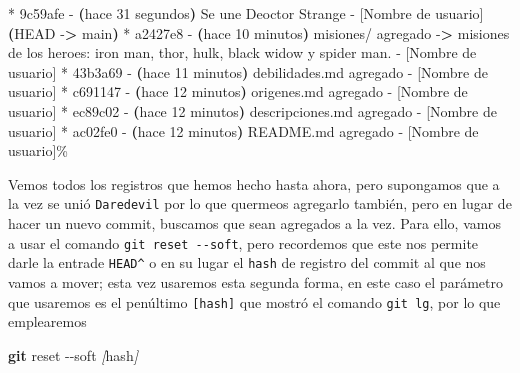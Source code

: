 \documentclass[
]{book}
\newenvironment{Shaded}{\begin{snugshade}}{\end{snugshade}}
\newcommand{\AttributeTok}[1]{\textcolor[rgb]{0.13,0.29,0.53}{#1}}
\newcommand{\ErrorTok}[1]{\textcolor[rgb]{0.64,0.00,0.00}{\textbf{#1}}}
\newcommand{\ExtensionTok}[1]{#1}
\newcommand{\FunctionTok}[1]{\textcolor[rgb]{0.13,0.29,0.53}{\textbf{#1}}}
\newcommand{\KeywordTok}[1]{\textcolor[rgb]{0.13,0.29,0.53}{\textbf{#1}}}
\newcommand{\NormalTok}[1]{#1}
\newcommand{\OperatorTok}[1]{\textcolor[rgb]{0.81,0.36,0.00}{\textbf{#1}}}
\newcommand{\PreprocessorTok}[1]{\textcolor[rgb]{0.56,0.35,0.01}{\textit{#1}}}
\newcommand{\SpecialStringTok}[1]{\textcolor[rgb]{0.31,0.60,0.02}{#1}}
\begin{document}
\begin{Shaded}
\begin{Highlighting}[]
\ExtensionTok{*}\NormalTok{ 9c59afe }\AttributeTok{{-}} \ErrorTok{(}\ExtensionTok{hace}\NormalTok{ 31 segundos}\KeywordTok{)} \ExtensionTok{Se}\NormalTok{ une Deoctor Strange }\AttributeTok{{-}}\NormalTok{ [Nombre de usuario] }\ErrorTok{(}\ExtensionTok{HEAD} \AttributeTok{{-}}\OperatorTok{\textgreater{}}\NormalTok{ main}\KeywordTok{)}
\ExtensionTok{*}\NormalTok{ a2427e8 }\AttributeTok{{-}} \ErrorTok{(}\ExtensionTok{hace}\NormalTok{ 10 minutos}\KeywordTok{)} \ExtensionTok{misiones/}\NormalTok{ agregado }\AttributeTok{{-}}\OperatorTok{\textgreater{}}\NormalTok{ misiones de los heroes: iron man, thor, hulk, black widow y spider man. }\AttributeTok{{-}}\NormalTok{ [Nombre de usuario]}
\ExtensionTok{*}\NormalTok{ 43b3a69 }\AttributeTok{{-}} \ErrorTok{(}\ExtensionTok{hace}\NormalTok{ 11 minutos}\KeywordTok{)} \ExtensionTok{debilidades.md}\NormalTok{ agregado }\AttributeTok{{-}}\NormalTok{ [Nombre de usuario]}
\ExtensionTok{*}\NormalTok{ c691147 }\AttributeTok{{-}} \ErrorTok{(}\ExtensionTok{hace}\NormalTok{ 12 minutos}\KeywordTok{)} \ExtensionTok{origenes.md}\NormalTok{ agregado }\AttributeTok{{-}}\NormalTok{ [Nombre de usuario]}
\ExtensionTok{*}\NormalTok{ ec89c02 }\AttributeTok{{-}} \ErrorTok{(}\ExtensionTok{hace}\NormalTok{ 12 minutos}\KeywordTok{)} \ExtensionTok{descripciones.md}\NormalTok{ agregado }\AttributeTok{{-}}\NormalTok{ [Nombre de usuario]}
\ExtensionTok{*}\NormalTok{ ac02fe0 }\AttributeTok{{-}} \ErrorTok{(}\ExtensionTok{hace}\NormalTok{ 12 minutos}\KeywordTok{)} \ExtensionTok{README.md}\NormalTok{ agregado }\AttributeTok{{-}}\NormalTok{ [Nombre de usuario]\%     }
\end{Highlighting}
\end{Shaded}

Vemos todos los registros que hemos hecho hasta ahora, pero supongamos que a la vez se unió \texttt{Daredevil} por lo que quermeos agregarlo también, pero en lugar de hacer un nuevo commit, buscamos que sean agregados a la vez. Para ello, vamos a usar
el comando \texttt{git\ reset\ -\/-soft}, pero recordemos que este nos permite darle la entrade \texttt{HEAD\^{}} o en su lugar el \texttt{hash} de registro del commit al que nos vamos a mover; esta vez usaremos esta segunda forma, en este caso el parámetro que usaremos es el penúltimo \texttt{{[}hash{]}} que mostró el comando \texttt{git\ lg}, por lo que emplearemos

\begin{Shaded}
\begin{Highlighting}[]
\FunctionTok{git}\NormalTok{ reset }\AttributeTok{{-}{-}soft} \PreprocessorTok{[}\SpecialStringTok{hash}\PreprocessorTok{]}
\end{Highlighting}
\end{Shaded}
\end{document}
